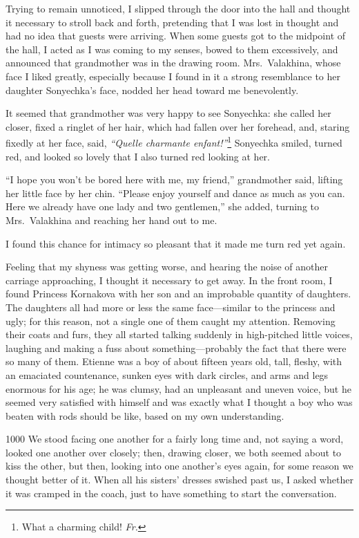Trying to remain unnoticed, I slipped through the door into the hall and thought it necessary to stroll back and forth, pretending that I was lost in thought and had no idea that guests were arriving. When some guests got to the midpoint of the hall, I acted as I was coming to my senses, bowed to them excessively, and announced that grandmother was in the drawing room. Mrs.~Valakhina, whose face I liked greatly, especially because I found in it a strong resemblance to her daughter Sonyechka's face, nodded her head toward me benevolently.

It seemed that grandmother was very happy to see Sonyechka: she called her closer, fixed a ringlet of her hair, which had fallen over her forehead, and, staring fixedly at her face, said, \textit{``Quelle charmante enfant!''}\footnote{What a charming child! \textit{Fr.}} Sonyechka smiled, turned red, and looked so lovely that I also turned red looking at her.

``I hope you won't be bored here with me, my friend,'' grandmother said, lifting her little face by her chin. ``Please enjoy yourself and dance as much as you can. Here we already have one lady and two gentlemen,'' she added, turning to Mrs.~Valakhina and reaching her hand out to me.

I found this chance for intimacy so pleasant that it made me turn red yet again.

Feeling that my shyness was getting worse, and hearing the noise of another carriage approaching, I thought it necessary to get away. In the front room, I found Princess Kornakova with her son and an improbable quantity of daughters. The daughters all had more or less the same face---similar to the princess and ugly; for this reason, not a single one of them caught my attention. Removing their coats and furs, they all started talking suddenly in high-pitched little voices, laughing and making a fuss about something---probably the fact that there were so many of them. Etienne was a boy of about fifteen years old, tall, fleshy, with an emaciated countenance, sunken eyes with dark circles, and arms and legs enormous for his age; he was clumsy, had an unpleasant and uneven voice, but he seemed very satisfied with himself and was exactly what I thought a boy who was beaten with rods should be like, based on my own understanding.

\begin{tolerant}{1000}
We stood facing one another for a fairly long time and, not saying a word, looked one another over closely; then, drawing closer, we both seemed about to kiss the other, but then, looking into one another's eyes again, for some reason we thought better of it. When all his sisters' dresses swished past us, I asked whether it was cramped in the coach, just to have something to start the conversation.
\end{tolerant}

